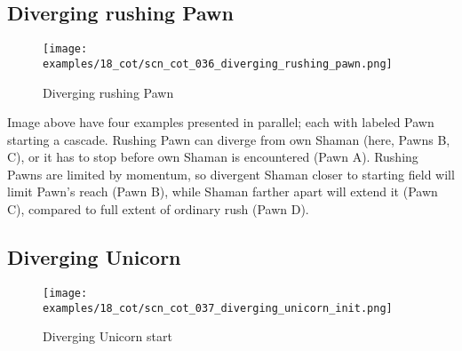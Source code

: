 \clearpage %

\subsection*{Diverging rushing Pawn}
\label{sec:Conquest of Tlalocan/Divergence/Diverging rushing Pawn}

\vspace*{-1.4\baselineskip}
\noindent
\begin{figure}[!h]
\texttt{[image: examples/18\_cot/scn\_cot\_036\_diverging\_rushing\_pawn.png]}
\vspace*{-1.3\baselineskip}
\caption{Diverging rushing Pawn}
\label{fig:scn_cot_036_diverging_rushing_pawn}
\end{figure}

\vspace*{-0.5\baselineskip}
Image above have four examples presented in parallel; each with labeled Pawn starting
a cascade. \newline
\indent
Rushing Pawn can diverge from own Shaman (here, Pawns B, C), or it has to stop before
own Shaman is encountered (Pawn A). Rushing Pawns are limited by momentum, so
divergent Shaman closer to starting field will limit Pawn's reach (Pawn B), while
Shaman farther apart will extend it (Pawn C), compared to full extent of ordinary
rush (Pawn D).

\clearpage %

\subsection*{Diverging Unicorn}
\label{sec:Conquest of Tlalocan/Divergence/Diverging Unicorn}

\vspace*{-1.4\baselineskip}
\noindent
\begin{figure}[!h]
\texttt{[image: examples/18\_cot/scn\_cot\_037\_diverging\_unicorn\_init.png]}
\vspace*{-1.3\baselineskip}
\caption{Diverging Unicorn start}
\label{fig:scn_cot_037_diverging_unicorn_init}
\end{figure}

